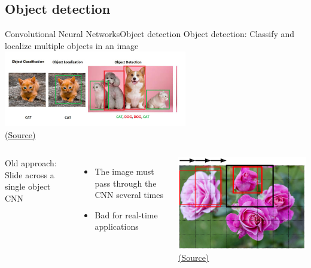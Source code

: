 \documentclass[10pt,compress]{beamer} %
\begin{document}
\subsection{Object detection}
\begin{frame}{Convolutional Neural Networks}{Object detection}
	\flushleft Object detection: Classify and localize multiple objects in an image \\ 
        \centering \includegraphics[width=0.6\textwidth]{figs/detection.jpg}\\
	\scriptsize\href{https://dev.to/sally20921/basics-of-object-detection-part-1-1i52}{(Source)}

	\normalsize

    \begin{columns}
	\flushleft Old approach: Slide across a single object CNN\\
	\begin{itemize}
		\item The image must pass through the CNN several times
		\item Bad for real-time applications
	\end{itemize}
        
        \centering \includegraphics[width=\textwidth]{figs/object}\\
	\scriptsize\href{http://powerunit-ju.com/wp-content/uploads/2021/04/Aurelien-Geron-Hands-On-Machine-Learning-with-Scikit-Learn-Keras-and-Tensorflow_-Concepts-Tools-and-Techniques-to-Build-Intelligent-Systems-OReilly-Media-2019.pdf}{(Source)}
    \end{columns}
\end{frame}
\end{document}

